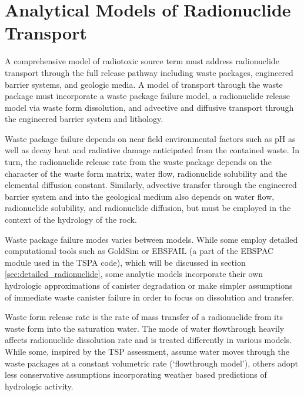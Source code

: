 
\section{Analytical Models of Radionuclide Transport} \label{sec:analytical_nuc}






A comprehensive model of radiotoxic source term must address radionuclide transport
through the full release pathway including waste packages, engineered barrier
systems, and geologic media. A model of transport through the waste package
must incorporate a waste package failure model, a radionuclide release model via 
waste form dissolution, and advective and diffusive transport through the 
engineered barrier system and lithology. 

Waste package failure depends on near field environmental factors such as
pH as well as decay heat and radiative damage anticipated from the
contained waste.  In turn, the radionuclide release rate from the waste package
depends on the character of the waste form matrix, water flow,
radionuclide solubility and the elemental diffusion constant.  Similarly, advective
transfer through the engineered barrier system and into the geological medium
also depends on water flow, radionuclide solubility, and radionuclide diffusion, but must
be employed in the context of the hydrology of the rock.   

Waste package failure modes varies between models. While some employ detailed 
computational tools such as GoldSim or EBSFAIL (a part of the EBSPAC module 
used in the TSPA code), which will be discussed in section 
\ref{sec:detailed_radionuclide}, some 
analytic models incorporate their own hydrologic approximations of
canister degradation or make simpler assumptions of immediate waste canister 
failure in order to focus on dissolution and transfer. 

Waste form release rate is the rate of mass transfer of a radionuclide from its
waste form into the saturation water. The mode of water flowthrough heavily
affects radionuclide dissolution rate and is treated differently in various models.
While some, inspired by the TSP assessment, assume water moves through the
waste packages at a constant volumetric rate (`flowthrough model'), others
adopt less conservative assumptions incorporating weather based predictions of
hydrologic activity.


